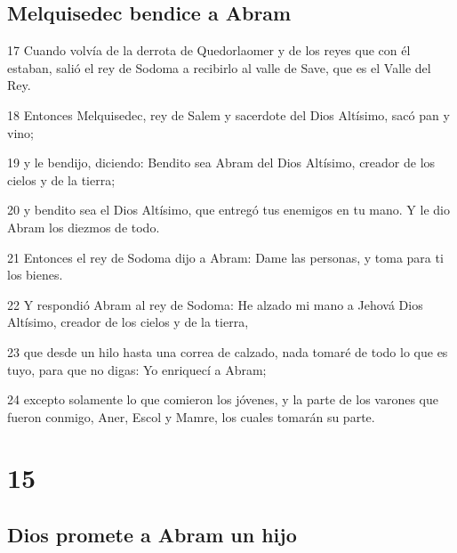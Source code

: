 \section*{Melquisedec bendice a Abram}

\par 17 Cuando volvía de la derrota de Quedorlaomer y de los reyes que con él estaban, salió el rey de Sodoma a recibirlo al valle de Save, que es el Valle del Rey.
\par 18 Entonces Melquisedec, rey de Salem y sacerdote del Dios Altísimo, sacó pan y vino;
\par 19 y le bendijo, diciendo: Bendito sea Abram del Dios Altísimo, creador de los cielos y de la tierra;
\par 20 y bendito sea el Dios Altísimo, que entregó tus enemigos en tu mano. Y le dio Abram los diezmos de todo.
\par 21 Entonces el rey de Sodoma dijo a Abram: Dame las personas, y toma para ti los bienes.
\par 22 Y respondió Abram al rey de Sodoma: He alzado mi mano a Jehová Dios Altísimo, creador de los cielos y de la tierra,
\par 23 que desde un hilo hasta una correa de calzado, nada tomaré de todo lo que es tuyo, para que no digas: Yo enriquecí a Abram;
\par 24 excepto solamente lo que comieron los jóvenes, y la parte de los varones que fueron conmigo, Aner, Escol y Mamre, los cuales tomarán su parte.

\chapter{15}

\section*{Dios promete a Abram un hijo}

